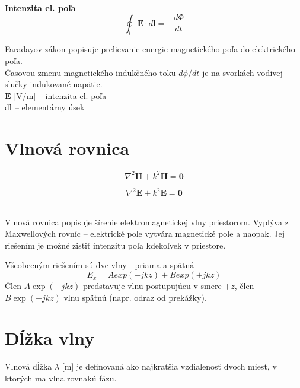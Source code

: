 \hfill
\begin{minipage}[t]{0.48\textwidth}
	\centering
	\textbf{Intenzita el. poľa}
	\begin{equation}
		\oint_{l} \mathbf{E}\cdot d\mathbf{l} = -\frac{d\Phi}{dt}
		\label{Faradayov_zakon}
	\end{equation}
	\raggedright
	\underline{Faradayov zákon} popisuje prelievanie energie magnetického poľa do elektrického poľa.\\
	\medskip
	Časovou zmenu magnetického indukčného toku $d\phi/dt$ je na svorkách vodivej slučky indukované napätie.\\
	\medskip
	$\mathbf{E}$ [V/m] -- intenzita el. poľa\\ 
	d$\mathbf{l}$ -- elementárny úsek		
\end{minipage}

\section{Vlnová rovnica}

\begin{minipage}[t]{0.48\textwidth}
	\begin{equation}
		\nabla^2\mathbf{H} + k^2\mathbf{H} = \mathbf{0}
	\end{equation}
\end{minipage}
	\hfill
\begin{minipage}[t]{0.48\textwidth}
	\begin{equation}
		\nabla^2\mathbf{E} + k^2\mathbf{E} = \mathbf{0}
	\end{equation}
\end{minipage}\\
\bigskip
Vlnová rovnica popisuje šírenie elektromagnetickej vlny priestorom. Vyplýva z Maxwellových rovníc -- elektrické pole vytvára magnetické pole a naopak. Jej riešením je možné zistiť intenzitu poľa kdekoľvek v priestore.

Všeobecným riešením sú dve vlny - priama a spätná
\begin{equation}
	E_x = A exp(-jkz) + B exp(+jkz)
\end{equation}
Člen $A\exp(-jkz)$ predstavuje vlnu postupujúcu v smere $+z$, člen $B\exp(+jkz)$ vlnu spätnú (napr. odraz od prekážky).

\section{Dĺžka vlny}
Vlnová dĺžka $\lambda$ [m] je definovaná ako najkratšia vzdialenosť dvoch miest, v ktorých ma vlna rovnakú fázu.

